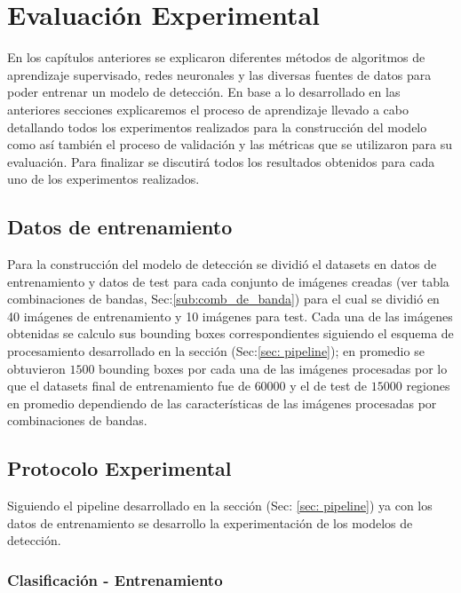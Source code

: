 \chapter{Evaluación Experimental}\label{chap:evaluacion}

En los capítulos anteriores se explicaron diferentes métodos de algoritmos de aprendizaje supervisado, redes neuronales y las diversas fuentes de datos para poder entrenar un modelo de detección. En  base a lo desarrollado en las anteriores secciones  explicaremos el proceso de aprendizaje llevado a cabo detallando todos los  experimentos realizados para la construcción del modelo como así también  el proceso de validación y las métricas que se utilizaron para su evaluación. Para finalizar se discutirá todos los resultados obtenidos para cada uno de los  experimentos realizados. 

\section{Datos de entrenamiento}\label{sec:datos_entrenamiento}

Para la construcción del modelo de detección se dividió el datasets en datos de entrenamiento y datos de test para cada conjunto de imágenes creadas (ver tabla combinaciones de bandas, Sec:\ref{sub:comb_de_banda}) para el cual se dividió en 40 imágenes de entrenamiento y 10 imágenes para test. Cada una de las imágenes obtenidas se calculo sus bounding boxes correspondientes  siguiendo el esquema de procesamiento desarrollado  en la sección (Sec:\ref{sec: pipeline}); en promedio se obtuvieron $1500$ bounding boxes por cada una de las imágenes procesadas por lo que el datasets final de entrenamiento fue de $60000$ y el de test de $15000$ regiones en promedio dependiendo de las características de las imágenes procesadas por combinaciones de bandas. 



\section{Protocolo Experimental}\label{sec:entrenamiento}

Siguiendo el pipeline desarrollado en la sección (Sec: \ref{sec: pipeline}) ya con los datos de entrenamiento se desarrollo la experimentación de los modelos de detección.

\subsection*{Clasificación - Entrenamiento}\label{sub:entr_class}

